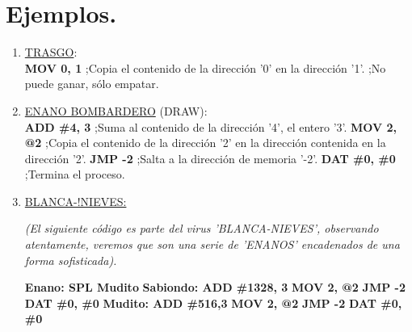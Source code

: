 \newpage
\section{Ejemplos.}
\noindent

\begin{enumerate}
    \item \underline{TRASGO}: \\
    \newline \textbf{MOV 0, 1} ;Copia el contenido de la dirección '0' en la dirección '1'. \newline \phantom{....................};No puede ganar, sólo empatar.
    \newline

    \item \underline{ENANO BOMBARDERO} (DRAW): \\
    \newline \textbf{ADD \#4, 3} \phantom{...};Suma al contenido de la dirección '4', el entero '3'.
    \newline \textbf{MOV 2, @2} \phantom{...};Copia el contenido de la dirección '2' en la dirección contenida \newline \phantom{..........................}en la dirección '2'.
    \newline \textbf{JMP -2} \phantom{...........};Salta a la dirección de memoria '-2'.
    \newline \textbf{DAT \#0, \#0} \phantom{.};Termina el proceso.
    \newline
    
    \item \underline{BLANCA-!NIEVES:}
    \begin{tcolorbox}
        \newline \textit{(El siguiente código es parte del virus 'BLANCA-NIEVES', observando atentamente, veremos que son una serie de 'ENANOS' encadenados de una forma sofisticada).}
    \end{tcolorbox}
    \newline \textbf{Enano: \phantom{.....}SPL Mudito}
    \newline \textbf{Sabiondo: ADD \#1328, 3}       
    \newline \textbf{\phantom{.................}MOV 2, @2}
    \newline \textbf{\phantom{.................}JMP -2}
    \newline \textbf{\phantom{.................}DAT \#0, \#0}
    \newline \textbf{Mudito: \phantom{...}ADD \#516,3}    
    \newline \textbf{\phantom{.................}MOV 2, @2}
    \newline \textbf{\phantom{.................}JMP -2} 
    \newline \textbf{\phantom{.................}DAT \#0, \#0}
    \newline
    

\end{enumerate}

